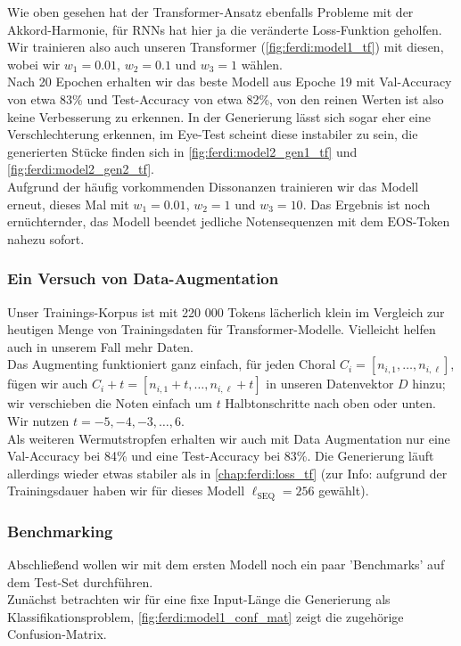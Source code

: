 Wie oben gesehen hat der Transformer-Ansatz ebenfalls Probleme mit der Akkord-Harmonie, für RNNs hat hier ja die
veränderte Loss-Funktion geholfen. Wir trainieren also auch unseren Transformer (\autoref{fig:ferdi:model1_tf}) mit
diesen, wobei wir $w_1 = 0.01$, $w_2 = 0.1$ und $w_3 = 1$ wählen. \\
Nach 20 Epochen erhalten wir das beste Modell aus Epoche 19 mit Val-Accuracy von etwa 83\% und Test-Accuracy von etwa 82\%,
von den reinen Werten ist also keine Verbesserung zu erkennen. In der Generierung lässt sich sogar eher eine Verschlechterung erkennen,
im Eye-Test scheint diese instabiler zu sein, die generierten Stücke finden sich in \autoref{fig:ferdi:model2_gen1_tf} und
\autoref{fig:ferdi:model2_gen2_tf}. \\
Aufgrund der häufig vorkommenden Dissonanzen trainieren wir das Modell erneut, dieses Mal mit $w_1 = 0.01$, $w_2 = 1$ und
$w_3 = 10$. Das Ergebnis ist noch ernüchternder, das Modell beendet jedliche Notensequenzen mit dem $\text{EOS}$-Token nahezu sofort.

\subsubsection{Ein Versuch von Data-Augmentation}
Unser Trainings-Korpus ist mit 220 000 Tokens lächerlich klein im Vergleich zur heutigen Menge von Trainingsdaten für Transformer-Modelle. Vielleicht helfen auch
in unserem Fall mehr Daten. \\
Das Augmenting funktioniert ganz einfach, für jeden Choral $C_i = [n_{i,1}, \dots, n_{i, \ell}]$, fügen wir auch $C_i + t = [n_{i,1}+t, \dots, n_{i, \ell}+t]$
in unseren Datenvektor $D$ hinzu; wir verschieben die Noten einfach um $t$ Halbtonschritte nach oben oder unten. Wir nutzen $t = -5, -4, -3, \dots, 6$. \\
Als weiteren Wermutstropfen erhalten wir auch mit Data Augmentation nur eine Val-Accuracy bei 84\% und eine Test-Accuracy bei 83\%. Die Generierung läuft allerdings 
wieder etwas stabiler als in \autoref{chap:ferdi:loss_tf} (zur Info: aufgrund der Trainingsdauer haben wir für dieses Modell $\ell_{\text{SEQ}} = 256$ gewählt).

\subsubsection{Benchmarking}\label{chap:ferdi:benchmark_tf}
Abschließend wollen wir mit dem ersten Modell noch ein paar 'Benchmarks'
auf dem Test-Set durchführen. \\
Zunächst betrachten wir für eine fixe Input-Länge die Generierung als Klassifikationsproblem, \autoref{fig:ferdi:model1_conf_mat} zeigt die zugehörige
Confusion-Matrix. \\

